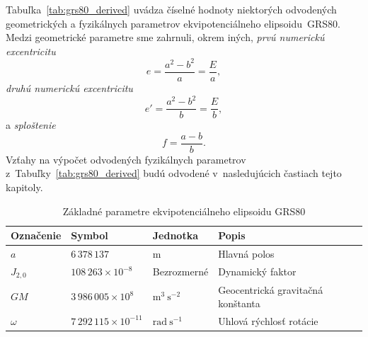 \documentclass[a4paper,12pt]{book}
\begin{document}
Tabuľka~\ref{tab:grs80_derived} uvádza číselné hodnoty niektorých odvodených geometrických 
a fyzikálnych parametrov ekvipotenciálneho elipsoidu~GRS80.  Medzi geometrické 
parametre sme zahrnuli, okrem iných, \emph{prvú numerickú excentricitu}
%
\begin{equation}
\label{eq:1st_eccentricity}
e = \frac{a^2 - b^2}{a} = \frac{E}{a}{,}
\end{equation}
%
\emph{druhú numerickú excentricitu}
%
\begin{equation}
\label{eq:2nd_eccentricity}
e' = \frac{a^2 - b^2}{b} = \frac{E}{b}{,}
\end{equation}
%
a \emph{sploštenie}
%
\begin{equation}
\label{eq:flattening}
f = \frac{a - b}{b}{.}
\end{equation}
%
Vzťahy na výpočet odvodených fyzikálnych parametrov z~Tabuľky~\ref{tab:grs80_derived} budú 
odvodené v~nasledujúcich častiach tejto kapitoly.

\begin{table}
\begin{center}
\caption{Základné parametre ekvipotenciálneho elipsoidu GRS80}
\label{tab:grs80_fundamental}
\small
\begin{tabular}{l l l l}
\hline
Označenie & Symbol & Jednotka & Popis\\
\hline
$a$       & $6\,378\,137$ & m & Hlavná polos\\
$J_{2,0}$ & $108\,263 \times 10^{-8}$ & Bezrozmerné & Dynamický faktor\\
$GM$ & $3\,986\,005 \times 10^8$ & $\mathrm{m}^3 \ \mathrm{s}^{-2}$ 
& Geocentrická gravitačná konštanta\\
$\omega$ & $7\,292\,115 \times 10^{-11}$ & $\mathrm{rad} \ \mathrm{s}^{-1}$ 
& Uhlová rýchlosť rotácie\\
\hline
\end{tabular}
\end{center}
\end{table}
\end{document}
